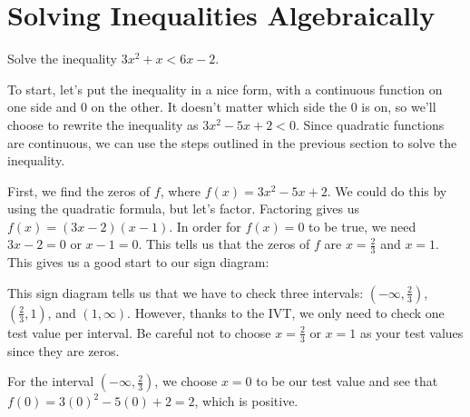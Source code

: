 \documentclass[noauthor, nooutcomes]{ximera}
\begin{document}
\section{Solving Inequalities Algebraically}
\begin{example}
Solve the inequality $3x^2 + x < 6x - 2$.
\end{example}
\begin{explanation}
To start, let's put the inequality in a nice form, with a continuous function on one side and 0 on the other. It doesn't matter which side the 0 is on, so we'll choose to rewrite the inequality as $3x^2 - 5x + 2 < 0$. Since quadratic functions are continuous, we can use the steps outlined in the previous section to solve the inequality.

First, we find the zeros of $f$, where $f(x) = 3x^2 - 5x + 2$. We could do this by using the quadratic formula, but let's factor. Factoring gives us $f(x) = (3x - 2)(x - 1)$. In order for $f(x) = 0$ to be true, we need $3x - 2 = 0$ or $x - 1 = 0$. This tells us that the zeros of $f$ are $x= \frac{2}{3}$ and $x = 1$. This gives us a good start to our sign diagram:

\begin{image}
\end{image}

This sign diagram tells us that we have to check three intervals: $\left(-\infty, \frac{2}{3}\right)$, $\left(\frac{2}{3}, 1\right)$, and $(1, \infty)$. However, thanks to the IVT, we only need to check one test value per interval. Be careful not to choose $x = \frac{2}{3}$ or $x = 1$ as your test values since they are zeros.

For the interval $\left(-\infty, \frac{2}{3}\right)$, we choose $x = 0$ to be our test value and see that $f(0) = 3(0)^2 - 5(0) + 2 = 2$, which is positive. 


\end{explanation}
\end{document}
